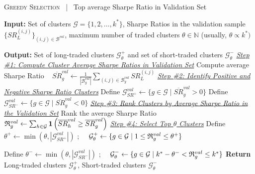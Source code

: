 \begin{algorithm}
\caption{
\textsc{Greedy Selection} 
~|~
{{Top average Sharpe Ratio in Validation Set}}
}
\label{alg:greedy_selection}
\begin{algorithmic}[1]
\mx 
\State \textbf{Input:} Set of clusters $\mathcal{G} = \{1, 2, \ldots, k^*\}$, Sharpe Ratios in the validation sample $\{SR_L^{(i,j)}\}_{(i,j)\in \mathcal B^{val}}$, maximum number of traded clusters $\theta\in\mathbb{N}$ (usually, $\theta\propto k^*)$

\mx 
\State \textbf{Output:} Set of long-traded clusters $\mathcal{G}_{\theta}^{+}$ and set of short-traded clusters $\mathcal{G}_{\theta}^{-}$
\vspace{0.4cm}
\Statex \underline{\textit{Step \#1: Compute Cluster Average Sharpe Ratios in Validation Set}}
    \State Compute average Sharpe Ratio ~
$
\overline{S R}_g^{val} \leftarrow \frac{1}{|\mathcal{B}_g^{val} |} \sum_{(i,j) \in \mathcal{B}_g^{val}} S R_{{{L}}}^{(i,j)}
$
\EndFor
\vspace{0.4cm}
\Statex \underline{\textit{Step \#2: Identify Positive and Negative Sharpe Ratio Clusters}}
\State Define $\mathcal{G}_{SR^+}^{val} \leftarrow \{ g \in \mathcal{G} \mid \overline{SR}_g^{val} > 0 \}$
\State Define $\mathcal{G}_{SR^-}^{val} \leftarrow \{ g \in \mathcal{G} \mid \overline{SR}_g^{val} < 0 \}$
\vspace{0.4cm}
\Statex \underline{\textit{Step \#3: Rank Clusters by Average Sharpe Ratio in the Validation Set}}
	\State Rank the average Sharpe Ratio~~
$
\mathfrak{R}_g^{val} \leftarrow  \sum_{h \in \mathcal{G}} 
\mathbf{1}\left(
\overline{S R}_h^{val} \geq \overline{S R}_g^{val} 
\right)
$
\EndFor
\vspace{0.4cm}
\Statex \underline{\textit{Step \#4: Select Top $\theta$ Clusters}}
\State Define $\theta^+ \leftarrow \min(\theta, |\mathcal{G}_{SR^+}^{val}|)$
;~~
$\mathcal{G}_{\theta}^{+} \leftarrow \{ g\in\mathcal{G} \mid 1 \leq \mathfrak{R}_g^{val} \leq \theta^+ \}$

\State Define $\theta^- \leftarrow \min(\theta, |\mathcal{G}_{SR^-}^{val}|)$
;~~
 $\mathcal{G}_{\theta}^{-} \leftarrow \{ g \in\mathcal{G} \mid k^* - \theta^- < \mathfrak{R}_g^{val} \leq k^* \}$
\vspace{0.5cm}
\State \textbf{Return} Long-traded clusters $\mathcal{G}_{\theta}^{+}$, Short-traded clusters $\mathcal{G}_{\theta}^{-}$

\end{algorithmic}
\end{algorithm}


